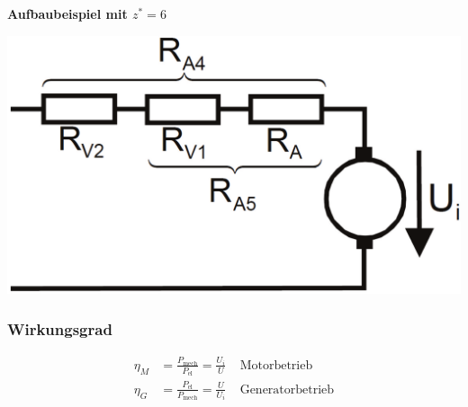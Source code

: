 \documentclass[a4paper,twocolumn,10pt]{article}
\begin{document}
\textbf{Aufbaubeispiel mit $z^*=6$}
\begin{center}
\includegraphics[width=0.7\linewidth]{Grafiken/Gleichstrommaschine_Vorwiderstand}
\end{center}


\subsubsection{Wirkungsgrad}
\begin{equation*}
\begin{split}
\eta_M&=\frac{P_{\text{mech}}}{P_{\text{el}}}=\frac{U_i}{U}\;\;\;\;\text{Motorbetrieb}\\
\eta_G&=\frac{P_{\text{el}}}{P_{\text{mech}}}=\frac{U}{U_i}\;\;\;\;\text{Generatorbetrieb}
\end{split}
\end{equation*}

\newpage
\end{document}
